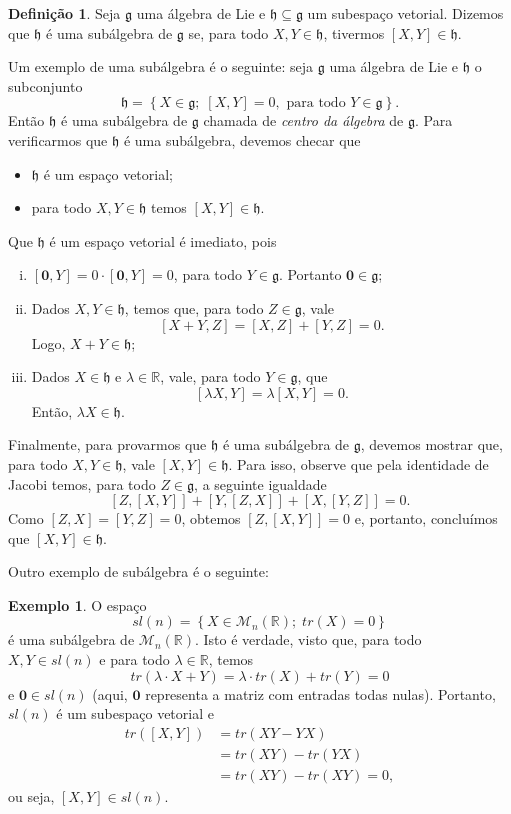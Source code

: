 \documentclass[twoside,openright,titlepage,numbers=noenddot,headinclude,  lineheaders footinclude=true,cleardoublepage=empty,
                                BCOR=5mm,paper=a4,fontsize=12pt ]{scrbook}
\theoremstyle{definition}
\newtheorem{definicao}{Definição}[chapter]
\newtheorem{exmp}{Exemplo}[section]
\begin{document}
\begin{definicao}
Seja $\mathfrak{g}$ uma álgebra de Lie e $\mathfrak{h} \subseteq \mathfrak{g}$ um subespaço vetorial. 
Dizemos que $\mathfrak{h}$ é uma subálgebra de $\mathfrak{g}$ se,
para todo $X, Y \in \mathfrak{h}$, tivermos $[X, Y] \in \mathfrak{h}$.
\end{definicao} 

Um exemplo de uma subálgebra é o seguinte: seja $\mathfrak{g}$ uma álgebra de Lie e $\mathfrak{h}$ o subconjunto
\[ \mathfrak{h} = \left\{ X \in \mathfrak{g}; \; [X, Y] = 0, \text{ para todo } Y \in \mathfrak{g} \right\}. \]
Então $\mathfrak{h}$ é uma subálgebra de $\mathfrak{g}$ chamada de \textit{centro da álgebra} de $\mathfrak{g}$. 
Para verificarmos que $\mathfrak{h}$ é uma subálgebra, devemos
checar que 
\begin{itemize}
	\item $\mathfrak{h}$ é um espaço vetorial;
	\item para todo $X, Y \in \mathfrak{h}$ temos $[X, Y] \in \mathfrak{h}$.
\end{itemize}
Que $\mathfrak{h}$ é um espaço vetorial é imediato, pois
\begin{enumerate}[(i)]
	\item $[\mathbf{0}, Y] = 0 \cdot [\mathbf{0}, Y] = 0$, para todo $Y \in \mathfrak{g}$. Portanto $\mathbf{0} \in \mathfrak{g}$;
	\item Dados $X, Y \in \mathfrak{h}$, temos que, para todo $Z \in \mathfrak{g}$, vale
		\[ [X + Y, Z] = [X, Z] + [Y, Z] = 0. \]
		Logo, $X+Y \in \mathfrak{h}$;
	\item Dados $X \in \mathfrak{h}$ e $\lambda \in \mathbb{R}$, vale, para todo $Y \in \mathfrak{g}$, que
		\[ [\lambda X, Y] = \lambda [X, Y] = 0. \]
		Então, $\lambda X \in \mathfrak{h}$.
\end{enumerate}
Finalmente, para provarmos que $\mathfrak{h}$ é uma subálgebra de $\mathfrak{g}$, devemos mostrar que,
 para todo $X, Y \in \mathfrak{h}$, vale $[X, Y] \in \mathfrak{h}$.
Para isso, observe que pela identidade de Jacobi temos, para todo $Z \in \mathfrak{g}$,  a seguinte igualdade
\[ [Z, [X, Y] ] + [Y, [Z, X] ] + [X, [Y, Z] ] = 0 .\]
Como $[Z, X] = [Y, Z] = 0$, obtemos $[Z, [X, Y] ] = 0$ e, portanto, concluímos que $[X, Y] \in \mathfrak{h}$.

Outro exemplo de subálgebra é o seguinte:
\begin{exmp}\label{tr_lie}
O espaço 
\[ sl(n) = \left\{ X \in \mathcal{M}_n( \mathbb{R} ); \; tr(X) =  0 \right\} \]
é uma subálgebra de $\mathcal{M}_n( \mathbb{R} )$. 
Isto é verdade, visto que, para todo $X, Y \in sl(n)$ e para todo $\lambda \in \mathbb{R}$, temos
\[ tr( \lambda \cdot X + Y) = \lambda \cdot tr(X) + tr(Y) = 0 \]
e $\mathbf{0} \in sl(n)$ (aqui, $\mathbf{0}$ representa a matriz com entradas todas nulas).
Portanto, $sl(n)$ é um subespaço vetorial e
\begin{align*}
tr( [X, Y] ) &= tr( XY - YX )\\
	     &= tr(XY) - tr(YX)\\
	     &= tr(XY) - tr(XY) = 0,
\end{align*}
ou seja, $[X, Y] \in sl(n)$.
\end{exmp}
\end{document}
